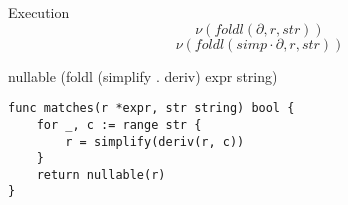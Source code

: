 \documentclass[10pt]{beamer}
\begin{document}
\begin{frame}[fragile]{Execution}
$$
\nu(foldl(\partial, r, str))
$$
$$
\nu(foldl(simp \cdot \partial, r, str))
$$
\begin{center}
\begin{haskellcode}
nullable (foldl (simplify . deriv) expr string)
\end{haskellcode}
\end{center}
\begin{center}
\begin{verbatim}
func matches(r *expr, str string) bool {
    for _, c := range str {
        r = simplify(deriv(r, c))
    }
    return nullable(r)
}
\end{verbatim}
\end{center}
\end{frame}
\end{document}
